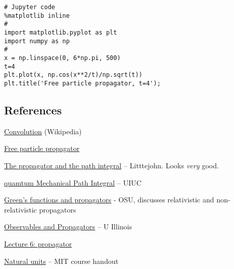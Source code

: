 



\begin{verbatim}
# Jupyter code
%matplotlib inline
#
import matplotlib.pyplot as plt
import numpy as np
#
x = np.linspace(0, 6*np.pi, 500)
t=4
plt.plot(x, np.cos(x**2/t)/np.sqrt(t))
plt.title('Free particle propagator, t=4');
\end{verbatim}


\subsection{References}

\href{https://en.wikipedia.org/wiki/Convolution}{Convolution} (Wikipedia)

\href{http://www.physics.rutgers.edu/~steves/501/Lectures_Final/Lec06_Propagator.pdf}{Free particle propagator}

\href{http://bohr.physics.berkeley.edu/classes/221/0708/notes/pathint.pdf}{The propagator and the path integral} -- Litttejohn.  Looks \emph{very} good.

\href{http://www.ks.uiuc.edu/Services/Class/PHYS480/qm_PDF/chp2.pdf}{quamtum Mechanical Path Integral} -- UIUC

\href{http://www.phy.ohiou.edu/~elster/lectures/relqm_17.pdf}{Green's functions and propagators}  - OSU, discusses relativistic and non-relativistic propagators

\href{http://eduardo.physics.illinois.edu/phys582/582-chapter10.pdf}{Observables and Propagators} -- U Illinois

\href{http://www.physics.rutgers.edu/~steves/501/Lectures_Final/Lec06_Propagator.pdf}{Lecture 6: propagator}

\href{https://stuff.mit.edu/afs/athena/course/8/8.06/spring08/handouts/units.pdf}{Natural units} -- MIT course handout
